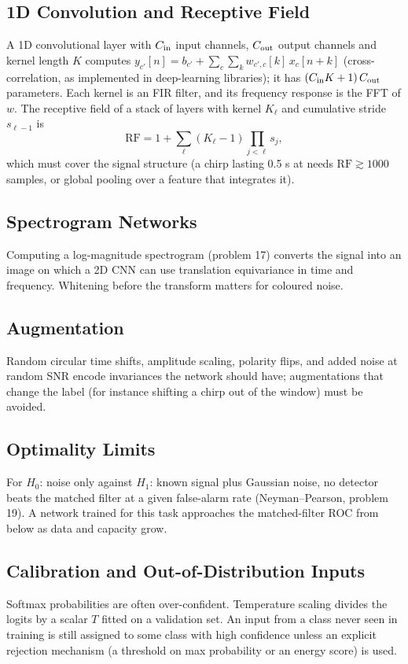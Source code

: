 \documentclass[11pt,a4paper]{article}
\begin{document}
\subsection{1D Convolution and Receptive Field}
A 1D convolutional layer with $C_{\rm in}$ input channels, $C_{\rm out}$ output channels and kernel length $K$ computes $y_{c'}[n]=b_{c'}+\sum_{c}\sum_{k}w_{c',c}[k]\,x_c[n+k]$ (cross-correlation, as implemented in deep-learning libraries); it has $(C_{\rm in}K+1)\,C_{\rm out}$ parameters. Each kernel is an FIR filter, and its frequency response is the FFT of $w$. The receptive field of a stack of layers with kernel $K_\ell$ and cumulative stride $s_{\ell-1}$ is
\begin{equation}
  \mathrm{RF}=1+\sum_\ell(K_\ell-1)\prod_{j<\ell}s_j,
  \label{eq:rf}
\end{equation}
which must cover the signal structure (a chirp lasting 0.5 s at  needs $\mathrm{RF}\gtrsim1000$ samples, or global pooling over a feature that integrates it).

\subsection{Spectrogram Networks}
Computing a log-magnitude spectrogram (problem 17) converts the signal into an image on which a 2D CNN can use translation equivariance in time and frequency. Whitening before the transform matters for coloured noise.

\subsection{Augmentation}
Random circular time shifts, amplitude scaling, polarity flips, and added noise at random SNR encode invariances the network should have; augmentations that change the label (for instance shifting a chirp out of the window) must be avoided.

\subsection{Optimality Limits}
For $H_0$: noise only against $H_1$: known signal plus Gaussian noise, no detector beats the matched filter at a given false-alarm rate (Neyman--Pearson, problem 19). A network trained for this task approaches the matched-filter ROC from below as data and capacity grow.

\subsection{Calibration and Out-of-Distribution Inputs}
Softmax probabilities are often over-confident. Temperature scaling divides the logits by a scalar $T$ fitted on a validation set. An input from a class never seen in training is still assigned to some class with high confidence unless an explicit rejection mechanism (a threshold on max probability or an energy score) is used.
\end{document}
